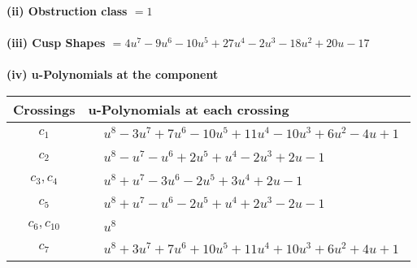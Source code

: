 \documentclass[1p]{elsarticle_modified}
\theoremstyle{definition}
\begin{document}
\flushleft \textbf{(ii) Obstruction class $= 1$}\\~\\
\flushleft \textbf{(iii) Cusp Shapes $= 4 u^7-9 u^6-10 u^5+27 u^4-2 u^3-18 u^2+20 u-17$}\\~\\
\newpage\renewcommand{\arraystretch}{1}
\flushleft \textbf{(iv) u-Polynomials at the component}\newline \\
\begin{tabular}{m{50pt}|m{274pt}}
Crossings & \hspace{64pt}u-Polynomials at each crossing \\
\hline $$\begin{aligned}c_{1}\end{aligned}$$&$\begin{aligned}
&u^8-3 u^7+7 u^6-10 u^5+11 u^4-10 u^3+6 u^2-4 u+1
\end{aligned}$\\
\hline $$\begin{aligned}c_{2}\end{aligned}$$&$\begin{aligned}
&u^8- u^7- u^6+2 u^5+u^4-2 u^3+2 u-1
\end{aligned}$\\
\hline $$\begin{aligned}c_{3},c_{4}\end{aligned}$$&$\begin{aligned}
&u^8+u^7-3 u^6-2 u^5+3 u^4+2 u-1
\end{aligned}$\\
\hline $$\begin{aligned}c_{5}\end{aligned}$$&$\begin{aligned}
&u^8+u^7- u^6-2 u^5+u^4+2 u^3-2 u-1
\end{aligned}$\\
\hline $$\begin{aligned}c_{6},c_{10}\end{aligned}$$&$\begin{aligned}
&u^8
\end{aligned}$\\
\hline $$\begin{aligned}c_{7}\end{aligned}$$&$\begin{aligned}
&u^8+3 u^7+7 u^6+10 u^5+11 u^4+10 u^3+6 u^2+4 u+1
\end{aligned}$\\

\end{tabular}
\end{document}
